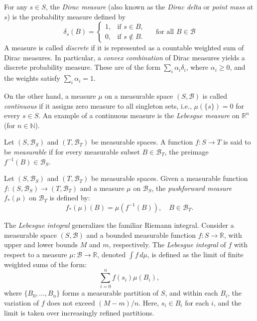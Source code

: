 
For any $ s \in S $, the \emph{Dirac measure} (also known as the \emph{Dirac delta} or \emph{point mass} at \( s \)) is the probability measure defined by
$$
\delta_s(B) =
\begin{cases}
1, & \text{if } s \in B, \\
0, & \text{if } s \notin B.
\end{cases} \quad \text{ for all } B \in \mathcal{B}
$$
A measure is called \emph{discrete} if it is represented as a countable weighted sum of Dirac measures. In particular, a \emph{convex combination} of Dirac measures yields a discrete probability measure. These are of the form $\sum_{i} \alpha_i \delta_i$,
where $ \alpha_i \geq 0 $, and the weights satisfy $ \sum_{i} \alpha_i = 1 $.

On the other hand, a measure $ \mu $ on a measurable space $ (S, \mathcal{B}) $ is called \emph{continuous} if it assigns zero measure to all singleton sets, i.e., $ \mu(\{s\}) = 0 $ for every $ s \in S $. An example of a continuous measure is the \emph{Lebesgue measure} on $ \mathbb{R}^n $ (for $ n \in \mathbb{N} $).

\begin{definition}
  Let $(S, \mathcal{B}_S)$ and $(T, \mathcal{B}_T)$ be measurable spaces. A function $f: S \to T$ is said to be \emph{measurable} if for every  measurable subset  $B \in \mathcal{B}_T$, the preimage $f^{-1}(B) \in \mathcal{B}_S$.
\end{definition}

\begin{definition} \label{def:pushforward_meas_1}
  Let $(S, \mathcal{B}_S)$ and $(T, \mathcal{B}_T)$ be measurable spaces. Given a measurable function $f: (S, \mathcal{B}_S) \to (T, \mathcal{B}_T)$ and a measure $\mu$ on $\mathcal{B}_S$, the \emph{pushforward measure} $f_*(\mu)$ on $\mathcal{B}_T$ is defined by:
$$
f_*(\mu)(B) = \mu(f^{-1}(B)), \quad  B \in \mathcal{B}_T.
$$
\end{definition}






\begin{definition} 
  The \emph{Lebesgue integral} generalizes the familiar Riemann integral. Consider a measurable space $(S, \mathcal{B})$ and a bounded measurable function $f \colon S \to \mathbb{R}$, with upper and lower bounds $M$ and $m$, respectively. The \emph{Lebesgue integral} of $f$ with respect to a measure $\mu \colon \mathcal{B} \to \mathbb{R}$, denoted $\int f \, d\mu$, is defined as the limit of finite weighted sums of the form:
$$
\sum_{i=0}^n f(s_i) \mu(B_i),
$$
where $\{B_0, \dots, B_n\}$ forms a measurable partition of $S$, and within each $B_i$, the variation of $f$ does not exceed $(M - m)/n$. Here, $s_i \in B_i$ for each $i$, and the limit is taken over increasingly refined partitions. 
\end{definition}


